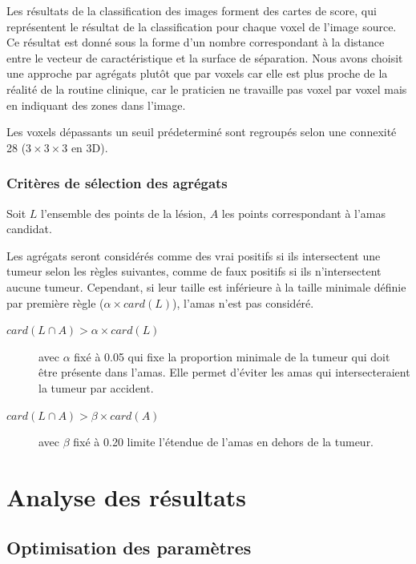 Les résultats de la classification des images forment des cartes de score, qui représentent le résultat de la classification pour chaque voxel de l'image source. Ce résultat est donné sous la forme d'un nombre correspondant à la distance entre le vecteur de caractéristique et la surface de séparation. Nous avons choisit une approche par agrégats plutôt que par voxels car elle est plus proche de la réalité de la routine clinique, car le praticien ne travaille pas voxel par voxel mais en indiquant des zones dans l'image.

Les voxels dépassants un seuil prédeterminé sont regroupés selon une connexité 28 ($3\times3\times3$ en 3D). 


\subsection{Critères de sélection des agrégats}

Soit $L$ l'ensemble des points de la lésion, $A$ les points correspondant à l'amas candidat.

Les agrégats seront considérés comme des vrai positifs si ils intersectent une tumeur selon les règles suivantes, comme de faux positifs si ils n'intersectent aucune tumeur. Cependant, si leur taille est inférieure à la taille minimale définie par première règle ($\alpha \times card( L )$), l'amas n'est pas considéré.


\begin{description}
 \item[$card( L \cap A ) > \alpha \times card( L )$] avec $\alpha$ fixé à 0.05 qui fixe la proportion minimale de la tumeur qui doit être présente dans l'amas. Elle permet d'éviter les amas qui intersecteraient la tumeur par accident.
 \item[$card( L \cap A ) > \beta \times card( A )$]  avec $\beta$ fixé à 0.20 limite l'étendue de l'amas en dehors de la tumeur.
\end{description}


\chapter{Analyse des résultats}

\section{Optimisation des paramètres}


